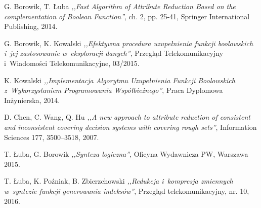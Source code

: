 
\begin{thebibliography}{99}


 G. Borowik, T. Łuba \emph{,,Fast Algorithm of Attribute Reduction Based on the complementation of Boolean Function''}, ch. 2, pp. 25-41, Springer International Publishing, 2014.

 G. Borowik, K. Kowalski \emph{,,Efektywna procedura uzupełnienia funkcji boolowskich i~jej zastosowanie w~eksploracji danych''}, Przegląd Telekomunikacyjny i~Wiadomości Telekomunikacyjne, 03/2015.

 K. Kowalski \emph{,,Implementacja Algorytmu Uzupełnienia Funkcji Boolowskich z~Wykorzystaniem Programowania Współbieżnego''}, Praca Dyplomowa Inżynierska, 2014.

 D. Chen, C. Wang, Q. Hu \emph{,,A new approach to attribute reduction of consistent and inconsistent covering decision systems with covering rough sets''}, Information Sciences 177, 3500–3518, 2007.

 T. Łuba, G. Borowik \emph{,,Synteza logiczna''}, Oficyna Wydawnicza PW, Warszawa 2015.

 T. Łuba, K. Poźniak, B. Zbierzchowski \emph{,,Redukcja i~kompresja zmiennych w~syntezie funkcji generowania indeksów''}, Przegląd telekomunikacyjny, nr. 10, 2016.


\end{thebibliography}
